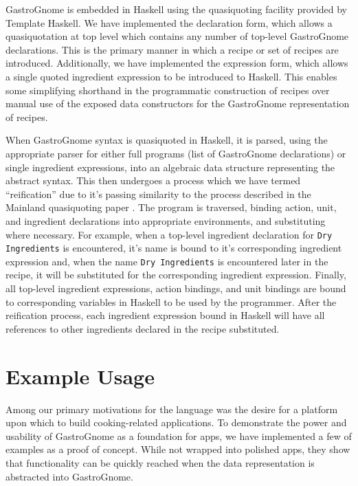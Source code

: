 \documentclass[pldi]{sigplanconf-pldi15}
\begin{document}
GastroGnome is embedded in Haskell using the quasiquoting facility provided by
Template Haskell. We have implemented the declaration form, which allows a
quasiquotation at top level which contains any number of top-level GastroGnome
declarations. This is the primary manner in which a recipe or set of recipes
are introduced. Additionally, we have implemented the expression form, which
allows a single quoted ingredient expression to be introduced to Haskell. This
enables some simplifying shorthand in the programmatic construction of recipes
over manual use of the exposed data constructors for the GastroGnome
representation of recipes.

When GastroGnome syntax is quasiquoted in Haskell, it is parsed, using the
appropriate parser for either full programs (list of GastroGnome declarations)
or single ingredient expressions, into an algebraic data structure
representing the abstract syntax. This then undergoes a process which we have
termed “reification” due to it’s passing similarity to the process described
in the Mainland quasiquoting paper \cite{mainland07quasiquoting}.  The
program is traversed, binding action, unit, and ingredient declarations into
appropriate environments, and substituting where necessary. For example, when
a top-level ingredient declaration for \texttt{Dry Ingredients} is
encountered, it’s name is bound to it’s corresponding ingredient expression
and, when the name \texttt{Dry Ingredients} is encountered later in the
recipe, it will be substituted for the corresponding ingredient expression.
Finally, all top-level ingredient expressions, action bindings, and unit
bindings are bound to corresponding variables in Haskell to be used by the
programmer.  After the reification process, each ingredient expression bound
in Haskell will have all references to other ingredients declared in the
recipe substituted.

\section{Example Usage}\label{sec:exampleusage}
Among our primary motivations for the language was the desire for a platform
upon which to build cooking-related applications. To demonstrate the power and
usability of GastroGnome as a foundation for apps, we have implemented a few
of examples as a proof of concept. While not wrapped into polished apps, they
show that functionality can be quickly reached when the data representation is
abstracted into GastroGnome.
\end{document}
